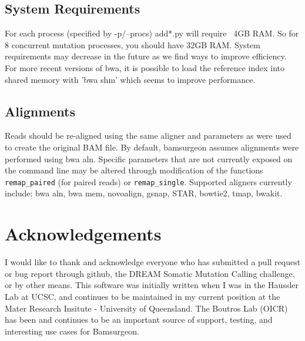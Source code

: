 \documentclass[letterpaper,11pt]{article}
\begin{document}
\subsection{System Requirements}
For each process (specified by -p/--procs) add*.py will require ~4GB RAM. So for 8 concurrent mutation processes, you should have 32GB RAM. System requirements may decrease in the future as we find ways to improve efficiency. For more recent versions of bwa, it is possible to load the reference index into shared memory with 'bwa shm' which seems to improve performance.

\subsection{Alignments}
Reads should be re-aligned using the same aligner and parameters as were used to create the original BAM file. By default, bamsurgeon assumes alignments were performed using bwa aln. Specific parameters that are not currently exposed on the command line may be altered through modification of the functions \texttt{remap\_paired} (for paired reads) or \texttt{remap\_single}. Supported aligners currently include: bwa aln, bwa mem, novoalign, gsnap, STAR, bowtie2, tmap, bwakit.

\section{Acknowledgements}
I would like to thank and acknowledge everyone who has submitted a pull request or bug report through github, the DREAM Somatic Mutation Calling challenge, or by other means. This software was initially written when I was in the Haussler Lab at UCSC, and continues to be maintained in my current position at the Mater Research Insitute - University of Queensland. The Boutros Lab (OICR) has been and continues to be an important source of support, testing, and interesting use cases for Bamsurgeon.
\end{document}
